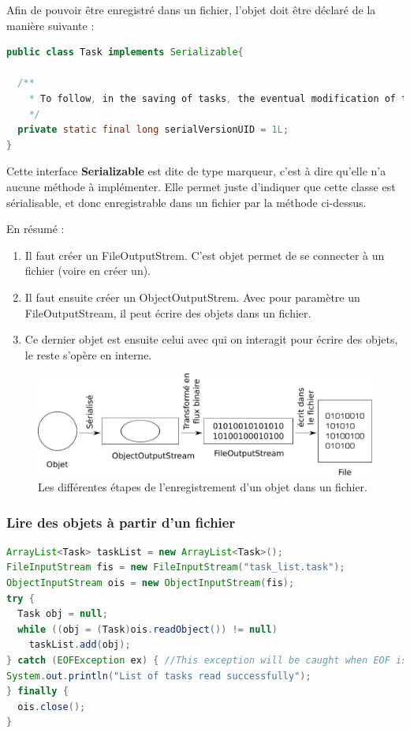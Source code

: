 \documentclass[a4paper,twoside]{article}
\begin{document}
\bigskip

Afin de pouvoir être enregistré dans un fichier, l'objet doit être déclaré de la manière suivante :
\begin{lstlisting}[language=java]
public class Task implements Serializable{
  
  /**
    * To follow, in the saving of tasks, the eventual modification of the class itself
    */
  private static final long serialVersionUID = 1L;
}
\end{lstlisting}
Cette interface \textbf{Serializable} est dite de type marqueur, c'est à dire qu'elle n'a aucune méthode à implémenter. Elle permet juste d'indiquer que cette classe est sérialisable, et donc enregistrable dans un fichier par la méthode ci-dessus.

\bigskip

En résumé : 
\begin{enumerate}
\item Il faut créer un FileOutputStrem. C'est objet permet de se connecter à un fichier (voire en créer un).
\item Il faut ensuite créer un ObjectOutputStrem. Avec pour paramètre un FileOutputStream, il peut écrire des objets dans un fichier.
\item Ce dernier objet est ensuite celui avec qui on interagit pour écrire des objets, le reste s'opère en interne.
\end{enumerate}

\begin{figure}[htb]
\centering
\includegraphics[width=0.65\linewidth]{figures/serialisation.pdf}
\caption{Les différentes étapes de l'enregistrement d'un objet dans un fichier.}
\end{figure}

\subsubsection{Lire des objets à partir d'un fichier}
\begin{lstlisting}[language=java]
ArrayList<Task> taskList = new ArrayList<Task>();
FileInputStream fis = new FileInputStream("task_list.task"); 
ObjectInputStream ois = new ObjectInputStream(fis);
try {
  Task obj = null;
  while ((obj = (Task)ois.readObject()) != null) 
    taskList.add(obj);
} catch (EOFException ex) { //This exception will be caught when EOF is reached
System.out.println("List of tasks read successfully");
} finally {
  ois.close();
}
\end{lstlisting}
\end{document}
